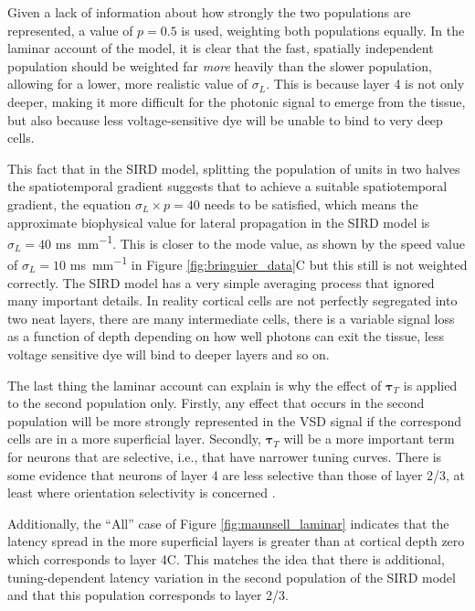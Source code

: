 \documentclass[phd,ianc,twoside]{infthesis}
\begin{document}
Given a lack of information about how strongly the two populations are
represented, a value of $p=0.5$ is used, weighting both populations
equally. In the laminar account of the model, it is clear that the fast,
spatially independent population should be weighted far \emph{more}
heavily than the slower population, allowing for a lower, more realistic
value of $\sigma_L$. This is because layer 4 is not only deeper, making
it more difficult for the photonic signal to emerge from the tissue, but
also because less voltage-sensitive dye will be unable to bind to very
deep cells.

This fact that in the SIRD model, splitting the population of units in
two halves the spatiotemporal gradient suggests that to achieve a
suitable spatiotemporal gradient, the equation $\sigma_L \times p = 40$
needs to be satisfied, which means the approximate biophysical value for
lateral propagation in the SIRD model is $\sigma_L=40$
\si{ms.mm^{-1}}. This is closer to the mode value, as shown by the speed
value of $\sigma_L=10$ \si{ms.mm^{-1}} in Figure
\ref{fig:bringuier_data}C but this still is not weighted correctly. The
SIRD model has a very simple averaging process that ignored many
important details. In reality cortical cells are not perfectly segregated
into two neat layers, there are many intermediate cells, there is a
variable signal loss as a function of depth depending on how well
photons can exit the tissue, less voltage sensitive dye will bind to
deeper layers and so on.

The last thing the laminar account can explain is why the effect of
$\pmb{\tau}_T$ is applied to the second population only. Firstly, any
effect that occurs in the second population will be more strongly
represented in the VSD signal if the correspond cells are in a more
superficial layer.  Secondly, $\pmb{\tau}_T$ will be a more important
term for neurons that are selective, i.e., that have narrower tuning
curves. There is some evidence that neurons of layer 4 are less
selective than those of layer 2/3, at least where orientation
selectivity is concerned
\citep{ringach_jn02,gur_cerebral05,snodderly_jneurophys95}.

Additionally, the ``All'' case of Figure \ref{fig:maunsell_laminar}
indicates that the latency spread in the more superficial layers is
greater than at cortical depth zero which corresponds to layer 4C. This
matches the idea that there is additional, tuning-dependent latency
variation in the second population of the SIRD model and that this
population corresponds to layer 2/3.
\end{document}
